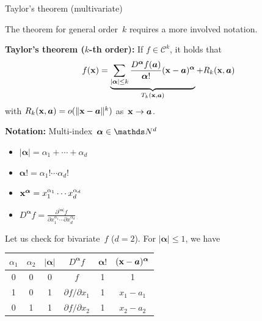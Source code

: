 \documentclass[11pt,compress,t,notes=noshow, xcolor=table]{beamer}
\begin{document}
\begin{vbframe}{Taylor's theorem (multivariate)}

The theorem for general order~$k$ requires a more involved notation.

\begin{kframe}
    \textbf{Taylor's theorem ($k$-th order):} If $f \in \mathcal{C}^k$, it holds that
    \begin{equation*}
        f(\mathbf{x}) = \underbrace{\sum_{|\bm{\alpha}| \le k} \frac{D^{\bm{\alpha}} f(\bm{a})}{{\bm{\alpha}}!} (\mathbf{x} - \bm{a})^{\bm{\alpha}}}_{T_k(\mathbf{x}, \bm{a})} + R_k(\mathbf{x}, \bm{a})
    \end{equation*}
    with $R_k(\mathbf{x}, \bm{a}) = {o}(\|\mathbf{x}-\bm{a}\|^k)$ as~$\mathbf{x} \to \bm{a}$.
\end{kframe}

\textbf{Notation:} Multi-index~$\bm{\alpha} \in \N^d$

\begin{minipage}[t]{0.49\linewidth}
    \begin{itemize}
        \item $|\bm{\alpha}| = \alpha_1 + \cdots + \alpha_d$
        \item $\bm{\alpha}! = \alpha_1! \cdots \alpha_d!$
    \end{itemize}
\end{minipage}
\begin{minipage}[t]{0.49\linewidth}
    \begin{itemize}
        \item $\mathbf{x}^{\bm{\alpha}} = x_1^{\alpha_1} \cdots x_d^{\alpha_d}$
        \item $D^{\bm{\alpha}} f = \frac{\partial^{|\bm{\alpha}|} f}{\partial x_1^{\alpha_1} \cdots \partial x_d^{\alpha_d}}$ 
    \end{itemize}
\end{minipage}

\framebreak 

Let us check for bivariate~$f$ ($d=2$).
For $|\bm{\alpha}| \le 1$, we have

\begin{table}
    \centering
    \begin{tabular}{c|c||c|c|c|c}
        $\alpha_1$ & $\alpha_2$ & $|\bm{\alpha}|$ & $D^{\bm{\alpha}} f$ & $\bm{\alpha}!$ & $(\mathbf{x}-\bm{a})^{\bm{\alpha}}$ \\ \hline\hline
        0 & 0 & 0 & $f$                         & 1 & 1          \\ \hline
        1 & 0 & 1 & $\partial f / \partial x_1$ & 1 & $x_1-a_1$  \\ \hline
        0 & 1 & 1 & $\partial f / \partial x_2$ & 1 & $x_2-a_2$
    \end{tabular}
\end{table}


\end{vbframe}
\end{document}
